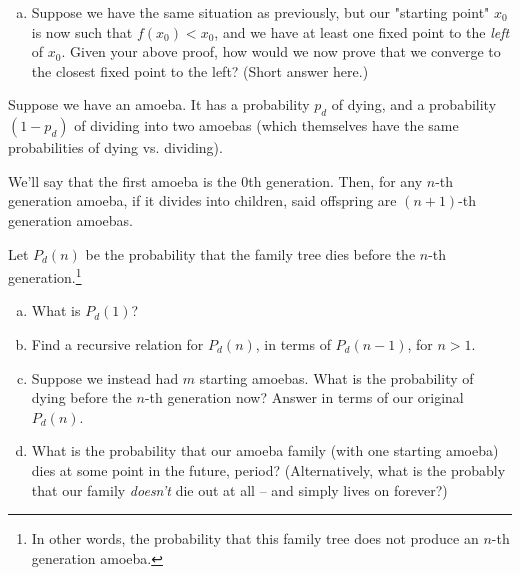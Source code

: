 \begin{problem}
\begin{enumerate}[(a)]


\item Suppose we have the same situation as previously, but our "starting point" $x_0$ is now such that $f(x_0) < x_0$, and we have at least one fixed point to the \emph{left} of $x_0$. Given your above proof, how would we now prove that we converge to the closest fixed point to the left? (Short answer here.)




\end{enumerate}
\end{problem}



\begin{problem}
\label{pr:amoeba-ngen}
Suppose we have an amoeba. It has a probability $p_d$ of dying, and a probability $(1 - p_d)$ of dividing into two amoebas (which themselves have the same probabilities of dying vs. dividing). 

We'll say that the first amoeba is the 0th generation. Then, for any $n$-th generation amoeba, if it divides into children, said offspring are $(n+1)$-th generation amoebas. 

Let $P_d(n)$ be the probability that the family tree dies before the $n$-th generation.\footnote{In other words, the probability that this family tree does not produce an $n$-th generation amoeba.}


\begin{enumerate}[(a)]
\item What is $P_d(1)$?
\item Find a recursive relation for $P_d(n)$, in terms of $P_d(n-1)$, for $n > 1$. 
\item Suppose we instead had $m$ starting amoebas. What is the probability of dying before the $n$-th generation now? Answer in terms of our original $P_d(n)$.
\item What is the probability that our amoeba family (with one starting amoeba) dies at some point in the future, period? (Alternatively, what is the probably that our family \emph{doesn't} die out at all -- and simply lives on forever?) %
\end{enumerate}
\hfill
\end{problem}

